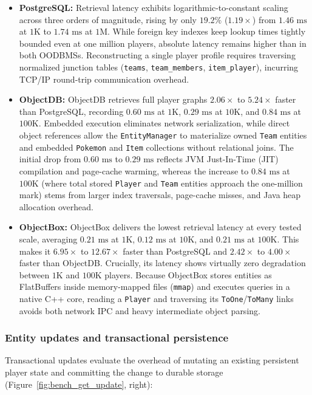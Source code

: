 \documentclass{article}
\begin{document}
\begin{itemize}
    \item \textbf{PostgreSQL:} Retrieval latency exhibits logarithmic-to-constant scaling across three orders of magnitude, rising by only $19.2\%$ ($1.19\times$) from $1.46\text{ ms}$ at $1\text{K}$ to $1.74\text{ ms}$ at $1\text{M}$. While foreign key indexes keep lookup times tightly bounded even at one million players, absolute latency remains higher than in both OODBMSs. Reconstructing a single player profile requires traversing normalized junction tables (\texttt{teams}, \texttt{team\_members}, \texttt{item\_player}), incurring TCP/IP round-trip communication overhead.

    \item \textbf{ObjectDB:} ObjectDB retrieves full player graphs $2.06\times$ to $5.24\times$ faster than PostgreSQL, recording $0.60\text{ ms}$ at $1\text{K}$, $0.29\text{ ms}$ at $10\text{K}$, and $0.84\text{ ms}$ at $100\text{K}$. Embedded execution eliminates network serialization, while direct object references allow the \texttt{EntityManager} to materialize owned \texttt{Team} entities and embedded \texttt{Pokemon} and \texttt{Item} collections without relational joins. The initial drop from $0.60\text{ ms}$ to $0.29\text{ ms}$ reflects JVM Just-In-Time (JIT) compilation and page-cache warming, whereas the increase to $0.84\text{ ms}$ at $100\text{K}$ (where total stored \texttt{Player} and \texttt{Team} entities approach the one-million mark) stems from larger index traversals, page-cache misses, and Java heap allocation overhead.

    \item \textbf{ObjectBox:} ObjectBox delivers the lowest retrieval latency at every tested scale, averaging $0.21\text{ ms}$ at $1\text{K}$, $0.12\text{ ms}$ at $10\text{K}$, and $0.21\text{ ms}$ at $100\text{K}$. This makes it $6.95\times$ to $12.67\times$ faster than PostgreSQL and $2.42\times$ to $4.00\times$ faster than ObjectDB. Crucially, its latency shows virtually zero degradation between $1\text{K}$ and $100\text{K}$ players. Because ObjectBox stores entities as FlatBuffers inside memory-mapped files (\texttt{mmap}) and executes queries in a native C++ core, reading a \texttt{Player} and traversing its \texttt{ToOne}/\texttt{ToMany} links avoids both network IPC and heavy intermediate object parsing.
\end{itemize}


\subsubsection{Entity updates and transactional persistence}
Transactional updates evaluate the overhead of mutating an existing persistent player state and committing the change to durable storage (Figure~\ref{fig:bench_get_update}, right):
\end{document}
